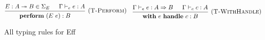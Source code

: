 \documentclass[class=article, crop=false]{standalone}
\begin{document}
\begin{figure}[H]
    $$
    \begin{prooftree}
      \hypo{E : A \tto B \in \Sigma_E}
      \hypo{\Gamma \vdash_e e : A}
      \infer2[(\textsc{T-Perform})]{\effPerform (E\ e) : B}
    \end{prooftree}
    \quad
    \begin{prooftree}
      \hypo{\Gamma \vdash_e e : A \handlerType B}
      \hypo{\Gamma \vdash_c c : A}
      \infer2[(\textsc{T-WithHandle})]{\effWith e \effHandle c : B}
    \end{prooftree}
    $$
    
    \caption{All typing rules for Eff}
    \label{fig:full-type-checking}
  \end{figure}
\end{document}
